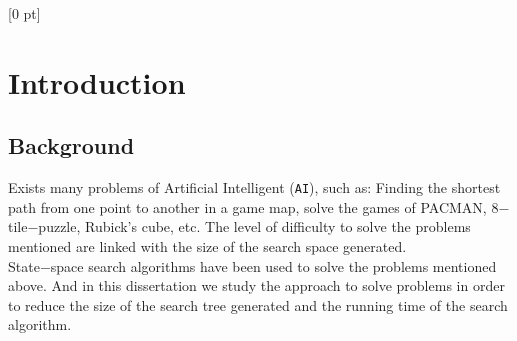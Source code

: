 \titlespacing{\chapter}{0 pt}{30 pt}{50 pt}[0 pt]
\titleformat{\section}{\Large\bfseries}{\thesection}{0 pt}{\hspace{30 pt}}
\titleformat{\subsection}{\large\bfseries}{\thesubsection}{0 pt}{\hspace{30 pt}}
\pagestyle{fancy}
\renewcommand{\chaptername}{CHAPTER}
\fancyhead[LO,LE]{\footnotesize\textit{\leftmark}}
\fancyhead[RO,RE]{\thepage}
\fancyfoot[CO,CE]{}
\chapter{Introduction} %
\normalsize
\section{Background}
\vspace{30 pt}
\noindent
Exists many problems of Artificial Intelligent (\texttt{AI}), such as: Finding the shortest path from one point to another in a game map, solve the games of PACMAN, 8$-$tile$-$puzzle, Rubick's cube, etc. The level of difficulty to solve the problems mentioned are linked with the size of the search space generated. \\

State$-$space search algorithms have been used to solve the problems mentioned above. And in this dissertation we study the approach to solve problems in order to reduce the size of the search tree generated and the running time of the search algorithm.

